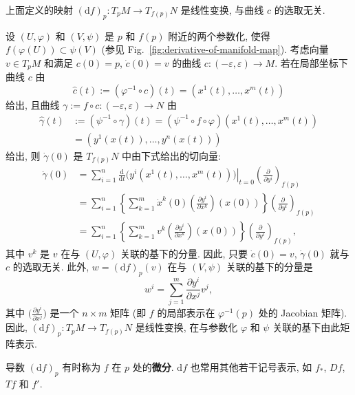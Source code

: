 \begin{RiemannProposition}\label{prop:linear-derivative-of-manifold-map}
上面定义的映射 $(\mathrm{d}f)_p:T_pM\to T_{f(p)}N$ 是线性变换, 与曲线 $c$ 的选取无关.
\end{RiemannProposition}

\begin{RiemannProof}
设 $(U,\varphi)$ 和 $(V,\psi)$ 是 $p$ 和 $f(p)$ 附近的两个参数化, 使得 $f(\varphi(U))\subset\psi(V)$ (参见 Fig.~\ref{fig:derivative-of-manifold-map}). 考虑向量 $v\in T_pM$ 和满足 $c(0)=p$, $\dot c(0)=v$ 的曲线 $c:(-\varepsilon,\varepsilon)\to M$. 若在局部坐标下曲线 $c$ 由
\[
  \widehat c(t):=(\varphi^{-1}\circ c)(t)=(x^1(t),\ldots,x^m(t))
\]
给出, 且曲线 $\gamma:=f\circ c:(-\varepsilon,\varepsilon)\to N$ 由
\begin{align*}
  \widehat\gamma(t)&:=(\psi^{-1}\circ\gamma)(t)
      =(\psi^{-1}\circ f\circ\varphi)(x^1(t),\ldots,x^m(t))\\
    &=(y^1(x(t)),\ldots,y^n(x(t)))
\end{align*}
给出, 则 $\dot\gamma(0)$ 是 $T_{f(p)}N$ 中由下式给出的切向量:
\begin{align*}
  \dot\gamma(0)
    &=\sum_{i=1}^n\left.\frac{\mathrm{d}}{\mathrm{d}t}
      \bigl(y^i(x^1(t),\ldots,x^m(t))\bigr)\right|_{t=0}
      \left(\frac{\partial}{\partial y^i}\right)_{f(p)}\\
    &=\sum_{i=1}^n\left\{\sum_{k=1}^m\dot x^k(0)
      \left(\frac{\partial y^i}{\partial x^k}\right)(x(0))\right\}
      \left(\frac{\partial}{\partial y^i}\right)_{f(p)}\\
    &=\sum_{i=1}^n\left\{\sum_{k=1}^m v^k
      \left(\frac{\partial y^i}{\partial x^k}\right)(x(0))\right\}
      \left(\frac{\partial}{\partial y^i}\right)_{f(p)},
\end{align*}
其中 $v^k$ 是 $v$ 在与 $(U,\varphi)$ 关联的基下的分量. 因此, 只要 $\dot c(0)=v$, $\dot\gamma(0)$ 就与 $c$ 的选取无关. 此外, $w=(\mathrm{d}f)_p(v)$ 在与 $(V,\psi)$ 关联的基下的分量是
\[
  w^i=\sum_{j=1}^m\frac{\partial y^i}{\partial x^j}v^j,
\]
其中 $\bigl(\frac{\partial y^i}{\partial x^j}\bigr)$ 是一个 $n\times m$ 矩阵 (即 $f$ 的局部表示在 $\varphi^{-1}(p)$ 处的 Jacobian 矩阵). 因此, $(\mathrm{d}f)_p:T_pM\to T_{f(p)}N$ 是线性变换, 在与参数化 $\varphi$ 和 $\psi$ 关联的基下由此矩阵表示.
\end{RiemannProof}


\begin{RiemannRemark}\label{rem:notations-for-derivative-of-manifold-map}
导数 $(\mathrm{d}f)_p$ 有时称为 $f$ 在 $p$ 处的\textbf{微分}. $\mathrm{d}f$ 也常用其他若干记号表示, 如 $f_*$, $Df$, $Tf$ 和 $f'$.
\end{RiemannRemark}

